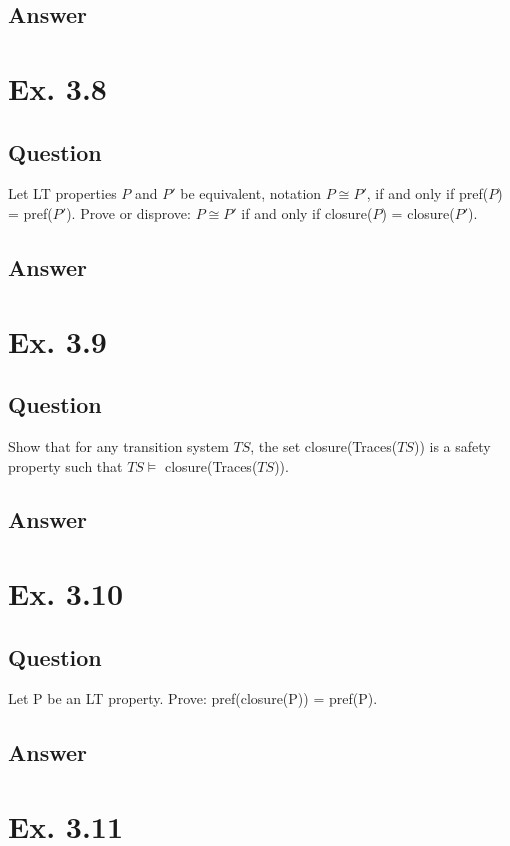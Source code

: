 \documentclass[12pt]{article}
\begin{document}
\subsection*{Answer}

\newpage

\section*{Ex. 3.8}
\subsection*{Question}
Let LT properties $P$ and $P'$ be equivalent, notation $P \cong P'$, if and only if
pref($P$) = pref($P'$). Prove or disprove: $P \cong P'$ if and only if closure($P$) = closure($P'$).

\subsection*{Answer}


\section*{Ex. 3.9}
\subsection*{Question}
Show that for any transition system $TS$, the set closure(Traces($TS$)) is a safety
property such that $TS \models $ closure(Traces($TS$)).

\subsection*{Answer}

\newpage
\section*{Ex. 3.10}
\subsection*{Question}
Let P be an LT property. Prove: pref(closure(P)) = pref(P).

\subsection*{Answer}

\section*{Ex. 3.11}
\end{document}
